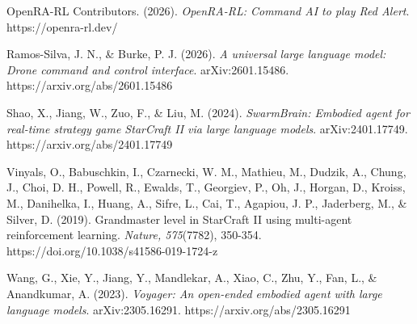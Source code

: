 \documentclass[
  journal]{IEEEtran}
\begin{document}
OpenRA-RL Contributors. (2026). \emph{OpenRA-RL: Command AI to play Red
Alert}. https://openra-rl.dev/

Ramos-Silva, J. N., \& Burke, P. J. (2026). \emph{A universal large
language model: Drone command and control interface}. arXiv:2601.15486.
https://arxiv.org/abs/2601.15486

Shao, X., Jiang, W., Zuo, F., \& Liu, M. (2024). \emph{SwarmBrain:
Embodied agent for real-time strategy game StarCraft II via large
language models}. arXiv:2401.17749. https://arxiv.org/abs/2401.17749

Vinyals, O., Babuschkin, I., Czarnecki, W. M., Mathieu, M., Dudzik, A.,
Chung, J., Choi, D. H., Powell, R., Ewalds, T., Georgiev, P., Oh, J.,
Horgan, D., Kroiss, M., Danihelka, I., Huang, A., Sifre, L., Cai, T.,
Agapiou, J. P., Jaderberg, M., \& Silver, D. (2019). Grandmaster level
in StarCraft II using multi-agent reinforcement learning. \emph{Nature,
575}(7782), 350-354. https://doi.org/10.1038/s41586-019-1724-z

Wang, G., Xie, Y., Jiang, Y., Mandlekar, A., Xiao, C., Zhu, Y., Fan, L.,
\& Anandkumar, A. (2023). \emph{Voyager: An open-ended embodied agent
with large language models}. arXiv:2305.16291.
https://arxiv.org/abs/2305.16291
\end{document}
